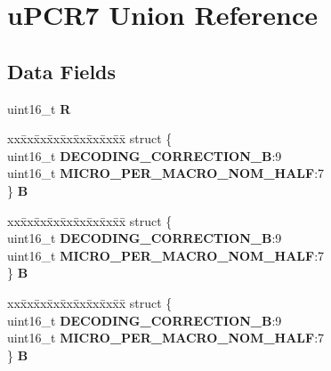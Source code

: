 \hypertarget{unionuPCR7}{}\section{u\+P\+C\+R7 Union Reference}
\label{unionuPCR7}
\subsection*{Data Fields}
\begin{DoxyCompactItemize}
\item 
\mbox{\label{unionuPCR7_aa27fab3d6882041c58d860a95a7bf058}} 
uint16\+\_\+t {\bfseries R}
\item 
\mbox{\label{unionuPCR7_a1c47fdb4e199f671001d64b0f46fd806}} 
\begin{tabbing}
xx\=xx\=xx\=xx\=xx\=xx\=xx\=xx\=xx\=\kill
struct \{\\
\>uint16\_t {\bfseries DECODING\_CORRECTION\_B}:9\\
\>uint16\_t {\bfseries MICRO\_PER\_MACRO\_NOM\_HALF}:7\\
\} {\bfseries B}\\

\end{tabbing}\item 
\mbox{\label{unionuPCR7_acc67b42818f59f88b83b8ce86045b32d}} 
\begin{tabbing}
xx\=xx\=xx\=xx\=xx\=xx\=xx\=xx\=xx\=\kill
struct \{\\
\>uint16\_t {\bfseries DECODING\_CORRECTION\_B}:9\\
\>uint16\_t {\bfseries MICRO\_PER\_MACRO\_NOM\_HALF}:7\\
\} {\bfseries B}\\

\end{tabbing}\item 
\mbox{\label{unionuPCR7_a9c5142b8f16baae56e154d23ec6dee27}} 
\begin{tabbing}
xx\=xx\=xx\=xx\=xx\=xx\=xx\=xx\=xx\=\kill
struct \{\\
\>uint16\_t {\bfseries DECODING\_CORRECTION\_B}:9\\
\>uint16\_t {\bfseries MICRO\_PER\_MACRO\_NOM\_HALF}:7\\
\} {\bfseries B}\\


\end{tabbing}
\end{DoxyCompactItemize}
